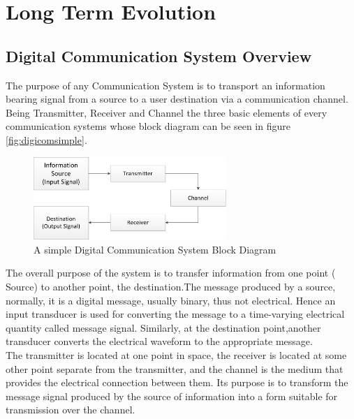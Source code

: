 \chapter{Long Term Evolution}
\label{chap:lte}

\section{Digital Communication System Overview}
\label{lte:digicomm}

The purpose of any Communication System is to transport an information bearing
signal from a source to a user destination via a communication channel. Being
Transmitter, Receiver and Channel the three basic elements of every
communication systems whose block diagram can be seen in figure \ref{fig:digicomsimple}.\\

\begin{figure}[htbp]
    \centering
    \includegraphics[width=0.65\textwidth]{./figures/digicom_simple}
    \caption{ A simple Digital Communication System Block Diagram
    \label{fig:digcomsimple}}
\end{figure}

The overall purpose of the system is to transfer information from one point (
Source) to another point, the destination.The message produced by a source,
normally, it is a digital message, usually binary, thus not electrical. Hence an
input transducer is used for converting the message to a time-varying electrical
quantity called message signal. Similarly, at the destination point,another
transducer converts the electrical waveform to the appropriate message.\\

The transmitter is located at one point in space, the receiver is located at
some other point separate from the transmitter, and the channel is the medium
that provides the electrical connection between them. Its purpose is to
transform the message signal produced by the source of information into a form
suitable for transmission over the channel.\\


